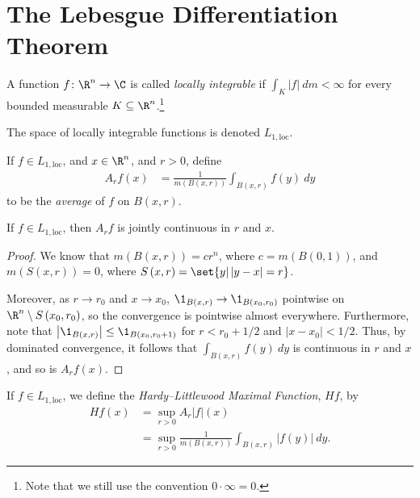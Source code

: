 \documentclass[10pt]{mypackage}
\begin{document}
\section{The Lebesgue Differentiation Theorem}%
\begin{definition}
  A function $f\colon \R^n\rightarrow \C$ is called \textit{locally integrable} if $ \int_{K}^{} \left\vert f \right\vert\:dm < \infty $ for every bounded measurable $K\subseteq \R^n$.\footnote{Note that we still use the convention $0\cdot \infty = 0$.}\newline

  The space of locally integrable functions is denoted $L_{1, \text{loc}}$.
\end{definition}
\begin{definition}
  If $f\in L_{1,\text{loc}}$, and $x\in \R^n$, and $r > 0$, define
  \begin{align*}
    A_rf(x) &= \frac{1}{m\left( B\left( x,r \right) \right)} \int_{B\left( x,r \right)}^{} f(y)\:dy
  \end{align*}
  to be the \textit{average} of $f$ on $B\left( x,r \right)$.
\end{definition}
\begin{lemma}
  If $f\in L_{1,\text{loc}}$, then $A_rf$ is jointly continuous in $r$ and $x$.
\end{lemma}
\begin{proof}
  We know that $m\left( B\left( x,r \right) \right) = cr^{n}$, where $c = m\left( B\left( 0,1 \right) \right)$, and $m\left( S\left( x,r \right) \right) = 0$, where $S\left( x,r \right) = \set{y | \left\vert y-x \right\vert = r}$.\newline

  Moreover, as $r\rightarrow r_0$ and $x\rightarrow x_0$, $\1_{B\left( x,r \right)}\rightarrow \1_{B\left( x_0,r_0 \right)}$ pointwise on $\R^n\setminus S\left( x_0,r_0 \right)$, so the convergence is pointwise almost everywhere. Furthermore, note that $\left\vert \1_{B\left( x,r \right)} \right\vert \leq \1_{B\left( x_0,r_0 + 1 \right)}$ for $r < r_0 + 1/2$ and $\left\vert x-x_0 \right\vert < 1/2$. Thus, by dominated convergence, it follows that $\int_{B\left( x,r \right)}^{} f(y)\:dy$ is continuous in $r$ and $x$, and so is $A_rf(x)$.
\end{proof}
\begin{definition}
  If $f\in L_{1,\text{loc}}$, we define the \textit{Hardy--Littlewood Maximal Function}, $Hf$, by
  \begin{align*}
    Hf(x) &= \sup_{r > 0} A_r\left\vert f \right\vert(x)\\
          &= \sup_{r > 0} \frac{1}{m\left( B\left( x,r \right) \right)} \int_{B\left( x,r \right)}^{} \left\vert f(y) \right\vert\:dy.
  \end{align*}
\end{definition}
\end{document}
